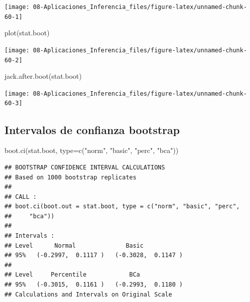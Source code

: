 \documentclass[
]{book}
\newenvironment{Shaded}{\begin{snugshade}}{\end{snugshade}}
\newcommand{\AttributeTok}[1]{\textcolor[rgb]{0.77,0.63,0.00}{#1}}
\newcommand{\ConstantTok}[1]{\textcolor[rgb]{0.00,0.00,0.00}{#1}}
\newcommand{\FunctionTok}[1]{\textcolor[rgb]{0.00,0.00,0.00}{#1}}
\newcommand{\NormalTok}[1]{#1}
\newcommand{\SpecialCharTok}[1]{\textcolor[rgb]{0.00,0.00,0.00}{#1}}
\newcommand{\StringTok}[1]{\textcolor[rgb]{0.31,0.60,0.02}{#1}}
\theoremstyle{break}
\theoremstyle{definition}
\theoremstyle{definition}
\theoremstyle{definition}
\theoremstyle{definition}
\theoremstyle{remark}
\begin{document}
\begin{Shaded}
\end{Shaded}

\begin{center}\texttt{[image: 08-Aplicaciones\_Inferencia\_files/figure-latex/unnamed-chunk-60-1]} \end{center}

\begin{Shaded}
\begin{Highlighting}[]
\FunctionTok{plot}\NormalTok{(stat.boot)}
\end{Highlighting}
\end{Shaded}

\begin{center}\texttt{[image: 08-Aplicaciones\_Inferencia\_files/figure-latex/unnamed-chunk-60-2]} \end{center}

\begin{Shaded}
\begin{Highlighting}[]
\FunctionTok{jack.after.boot}\NormalTok{(stat.boot)}
\end{Highlighting}
\end{Shaded}

\begin{center}\texttt{[image: 08-Aplicaciones\_Inferencia\_files/figure-latex/unnamed-chunk-60-3]} \end{center}

\hypertarget{intervalos-de-confianza-bootstrap}{%
\subsection{Intervalos de confianza bootstrap}\label{intervalos-de-confianza-bootstrap}}

\begin{Shaded}
\begin{Highlighting}[]
\FunctionTok{boot.ci}\NormalTok{(stat.boot, }\AttributeTok{type=}\FunctionTok{c}\NormalTok{(}\StringTok{"norm"}\NormalTok{, }\StringTok{"basic"}\NormalTok{, }\StringTok{"perc"}\NormalTok{, }\StringTok{"bca"}\NormalTok{))}
\end{Highlighting}
\end{Shaded}

\begin{verbatim}
## BOOTSTRAP CONFIDENCE INTERVAL CALCULATIONS
## Based on 1000 bootstrap replicates
## 
## CALL : 
## boot.ci(boot.out = stat.boot, type = c("norm", "basic", "perc", 
##     "bca"))
## 
## Intervals : 
## Level      Normal              Basic         
## 95%   (-0.2997,  0.1117 )   (-0.3028,  0.1147 )  
## 
## Level     Percentile            BCa          
## 95%   (-0.3015,  0.1161 )   (-0.2993,  0.1180 )  
## Calculations and Intervals on Original Scale
\end{verbatim}
\end{document}

